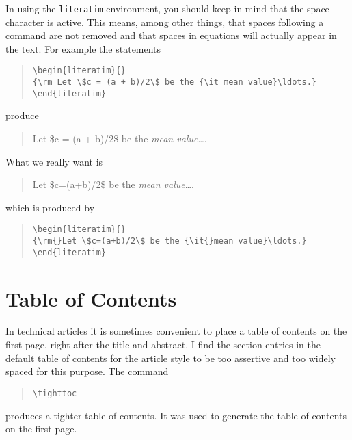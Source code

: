 In using the \verb|literatim| environment, you should keep in
mind that the space character is active.  This means, among
other things, that spaces following a command are not removed
and that spaces in equations will actually appear in the text.
For example the statements
\begin{quote}
\begin{verbatim}
\begin{literatim}{}
{\rm Let \$c = (a + b)/2\$ be the {\it mean value}\ldots.} 
\end{literatim}
\end{verbatim}
\end{quote}
produce
\begin{quote}
\begin{literatim}{}
{\rm Let \$c = (a + b)/2\$ be the {\it mean value}\ldots.}
\end{literatim}
\end{quote}
What we really want is
\begin{quote}
\begin{literatim}{}
{\rm{}Let \$c=(a+b)/2\$ be the {\it{}mean value}\ldots.}
\end{literatim}
\end{quote}
which is produced by
\begin{quote}
\begin{verbatim}
\begin{literatim}{}
{\rm{}Let \$c=(a+b)/2\$ be the {\it{}mean value}\ldots.}
\end{literatim}
\end{verbatim}
\end{quote}

\section{Table of Contents}

In technical articles it is sometimes convenient to place a
table of contents on the first page, right after the title and
abstract.  I find the section entries in the default table of
contents for the article style to be too assertive and too
widely spaced for this purpose.  The command
\begin{quote}
\begin{verbatim}
\tighttoc
\end{verbatim}
\end{quote}
produces a tighter table of contents.  It was used to generate
the table of contents on the first page.

